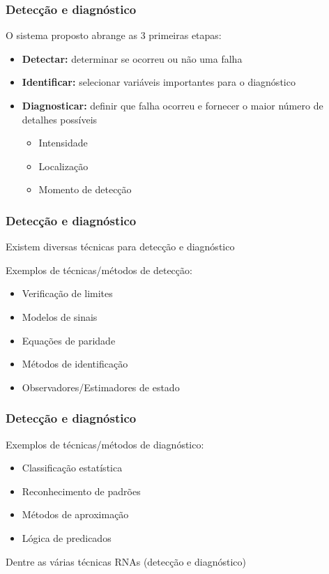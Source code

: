 \documentclass{beamer}
\begin{document}
\begin{frame}
    \frametitle{Detecção e diagnóstico}

    O sistema proposto abrange as 3 primeiras etapas:

\begin{itemize}
    \item {\bf Detectar:} determinar se ocorreu ou não uma falha
    \item {\bf Identificar:} selecionar variáveis importantes para o diagnóstico
    \item {\bf Diagnosticar:} definir que falha ocorreu e fornecer o maior
          número de detalhes possíveis
    \begin{itemize}
        \item Intensidade
        \item Localização
        \item Momento de detecção
    \end{itemize}
\end{itemize}
\end{frame}

\begin{frame}
    \frametitle{Detecção e diagnóstico}

    Existem diversas técnicas para detecção e diagnóstico

    \vspace{0.25cm}

    Exemplos de técnicas/métodos de detecção:
\begin{itemize}
    \item Verificação de limites
    \item Modelos de sinais
    \item Equações de paridade
    \item Métodos de identificação
    \item Observadores/Estimadores de estado
\end{itemize}
\end{frame}

\begin{frame}
    \frametitle{Detecção e diagnóstico}

    Exemplos de técnicas/métodos de diagnóstico:
\begin{itemize}
    \item Classificação estatística
    \item Reconhecimento de padrões
    \item Métodos de aproximação
    \item Lógica de predicados
\end{itemize}

    Dentre as várias técnicas \implica RNAs (detecção e diagnóstico)
\end{frame}
\end{document}
